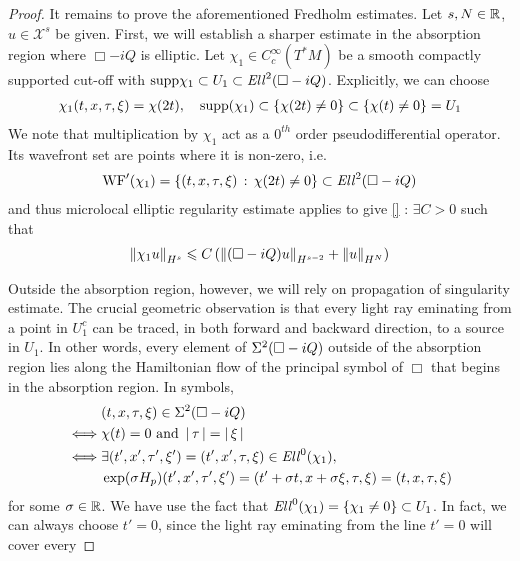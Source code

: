 \documentclass[12pt]{article}
\begin{document}
\begin{proof}
    It remains to prove the aforementioned Fredholm estimates. Let $s, N \in \R$, $u \in \mathcal{X}^s$ be given. First, we will establish a sharper estimate in the absorption region where $\Box - iQ$ is elliptic. Let $\chi_1 \in C^{\infty}_c(T^*M)$ be a smooth compactly supported cut-off with $\supp \chi_1 \subset U_1 \subset \Ell^2( \Box - iQ)$. Explicitly, we can choose
    \begin{align*}
    \chi_1(t, x, \tau, \xi) = \chi(2 t), \quad \supp(\chi_1) \subset \set{\chi(2t) \neq 0} \subset \set{\chi(t) \neq 0} = U_1
    \end{align*}
    We note that multiplication by $\chi_1$ act as a $0^{th}$ order pseudodifferential operator. Its wavefront set are points where it is non-zero, i.e. 
    \begin{align*}
    \WF'(\chi_1) = \set{(t, x, \tau, \xi) \wh \chi(2t) \neq 0 } \subset \Ell^2(\Box - iQ)
    \end{align*}
    and thus microlocal elliptic regularity estimate applies to give  \ref{} : $\exists C > 0$ such that
    \begin{align*}
    \norm[\chi_1 u]_{H^s} \leq C \brac{\norm[(\Box - iQ)u ]_{H^{s - 2}} + \norm[u]_{H^N}}
    \end{align*}
    
     Outside the absorption region, however, we will rely on propagation of singularity estimate. The crucial geometric observation is that every light ray eminating from a point in $U_1^c$ can be traced, in both forward and backward direction, to a source in $U_1$. In other words, every element of $\Char^2(\Box - iQ)$ outside of the absorption region lies along the Hamiltonian flow of the principal symbol of $\Box$ that begins in the absorption region. In symbols,  
     \begin{align*}
     &(t, x, \tau, \xi) \in \Char^2(\Box - iQ) \\
     \iff & \chi(t) = 0 \text{ and } \abs{\tau} = \abs{\xi}\\
     \iff & \exists (t', x', \tau', \xi') = (t', x', \tau, \xi) \in \Ell^0(\chi_1), \\
      & \exp(\sigma H_p)(t', x', \tau', \xi') = (t' + \sigma t, x + \sigma \xi, \tau, \xi) = (t, x, \tau, \xi)
     \end{align*}
     for some $\sigma  \in \R$. We have use the fact that $\Ell^0(\chi_1) = \set{\chi_1 \neq 0 } \subset U_1$. In fact, we can always choose $t' = 0$, since the light ray eminating from the line $t' = 0$ will cover every  
     

\end{proof}
\end{document}
